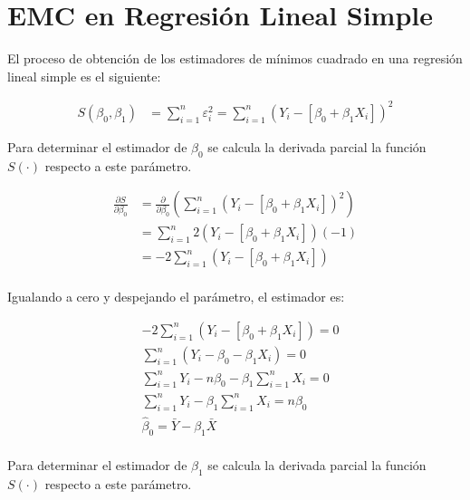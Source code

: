 \documentclass[
  11pt,
]{book}
\theoremstyle{definition}
\theoremstyle{definition}
\theoremstyle{definition}
\theoremstyle{definition}
\theoremstyle{remark}
\begin{document}
\section{EMC en Regresión Lineal Simple}\label{RLS-EMC}

El proceso de obtención de los estimadores de mínimos cuadrado en una regresión lineal simple es el siguiente:

\begin{equation}
\begin{split}
S(\beta_0,\beta_1) &= \sum_{i=1}^n\varepsilon_i^2 = \sum_{i=1}^n (Y_i - [\beta_0 + \beta_1X_i])^2
\end{split}
\label{eq:betasestimador-demostracion}
\end{equation}

Para determinar el estimador de \(\beta_0\) se calcula la derivada parcial la función \(S(\cdot)\) respecto a este parámetro.

\begin{equation}
\begin{split}
\frac{\partial S}{\partial\beta_0} &= \frac{\partial }{\partial\beta_0}\left(\sum_{i=1}^n (Y_i - [\beta_0 + \beta_1X_i])^2\right)\\
&= \sum_{i=1}^n 2(Y_i - [\beta_0 + \beta_1X_i])(-1)\\
&= -2\sum_{i=1}^n (Y_i - [\beta_0 + \beta_1X_i])\\
\end{split}
\label{eq:beta0estimador-demostracion1}
\end{equation}

Igualando a cero y despejando el parámetro, el estimador es:

\begin{equation}
\begin{split}
&-2\sum_{i=1}^n (Y_i - [\beta_0 + \beta_1X_i]) = 0\\
&\sum_{i=1}^n (Y_i - \beta_0 - \beta_1X_i) = 0\\
&\sum_{i=1}^n Y_i - n\beta_0 - \beta_1\sum_{i=1}^nX_i = 0\\
&\sum_{i=1}^n Y_i - \beta_1\sum_{i=1}^nX_i = n\beta_0\\
&\widehat{\beta}_0 = \bar{Y} - \beta_1\bar{X} \\
\end{split}
\label{eq:beta0estimador-demostracion2}
\end{equation}

Para determinar el estimador de \(\beta_1\) se calcula la derivada parcial la función \(S(\cdot)\) respecto a este parámetro.
\end{document}
